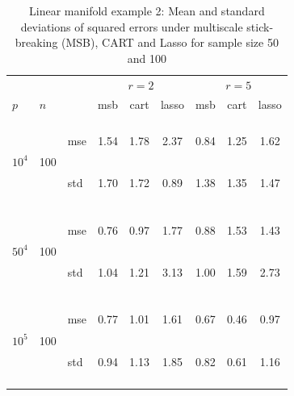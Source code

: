 \documentclass{article} %
\newcommand{\efoo}{\end{footnotesize}}
\newcommand{\bfoo}{\begin{footnotesize}}
\begin{document}
\begin{table}[t]
\caption{Linear manifold example 2: Mean and standard deviations of squared errors under multiscale stick-breaking (MSB), CART and Lasso for sample size 50 and 100}\label{table:linear2}
\vskip 0.15in
\begin{center}
\begin{small}
\begin{sc}
\begin{tabular}{lllcccccc}
\hline
&&&\multicolumn{3}{c}{$r=2$}&\multicolumn{3}{c}{$r=5$}\\
$p$&$n$& & msb&cart&lasso & msb&cart&lasso \\

%
%
\\

\multirow{2}{*}{$10^4$}&\multirow{2}{*}{100}&\bfoo mse\efoo&1.54 &1.78&2.37&0.84&1.25&1.62\\
&&\bfoo std\efoo &1.70&1.72&0.89&1.38&1.35&1.47\\


\\
\multirow{2}{*}{$50^4$}&\multirow{2}{*}{100}&\bfoo mse\efoo&0.76&0.97&1.77&0.88&1.53&1.43\\
&&\bfoo std\efoo &1.04&1.21&3.13&1.00&1.59&2.73\\

\\

\multirow{2}{*}{$10^5$}&\multirow{2}{*}{100}&\bfoo mse\efoo&0.77 &1.01&1.61&0.67&0.46&0.97\\
&&\bfoo std\efoo &0.94&1.13&1.85&0.82&0.61&1.16\\
\\


\end{tabular}
\end{sc}
\end{small}
\end{center}
\end{table}
\end{document}
